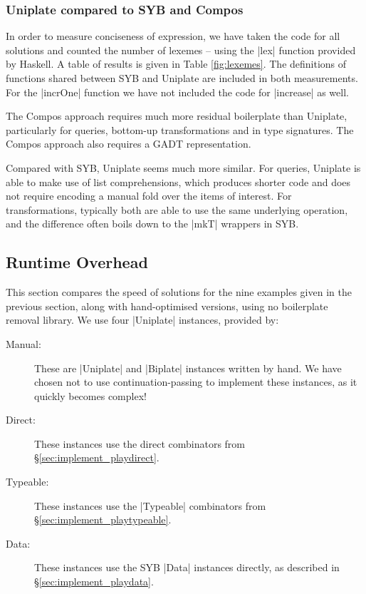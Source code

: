 \subsubsection{Uniplate compared to SYB and Compos}

In order to measure conciseness of expression, we have taken the code for all solutions and counted the number of lexemes -- using the |lex| function provided by Haskell. A table of results is given in Table \ref{fig:lexemes}. The definitions of functions shared between SYB and Uniplate are included in both measurements. For the |incrOne| function we have not included the code for |increase| as well.

The Compos approach requires much more residual boilerplate than Uniplate, particularly for queries, bottom-up transformations and in type signatures. The Compos approach also requires a GADT representation.

Compared with SYB, Uniplate seems much more similar. For queries, Uniplate is able to make use of list comprehensions, which produces shorter code and does not require encoding a manual fold over the items of interest. For transformations, typically both are able to use the same underlying operation, and the difference often boils down to the |mkT| wrappers in SYB.


\subsection{Runtime Overhead}
\label{sec:results_speed}

This section compares the speed of solutions for the nine examples given in the previous section, along with hand-optimised versions, using no boilerplate removal library. We use four |Uniplate| instances, provided by:

\begin{description}
\item[Manual:] These are |Uniplate| and |Biplate| instances written by hand. We have chosen not to use continuation-passing to implement these instances, as it quickly becomes complex!
\item[Direct:] These instances use the direct combinators from \S\ref{sec:implement_playdirect}.
\item[Typeable:] These instances use the |Typeable| combinators from \S\ref{sec:implement_playtypeable}.
\item[Data:] These instances use the SYB |Data| instances directly, as described in \S\ref{sec:implement_playdata}.
\end{description}

